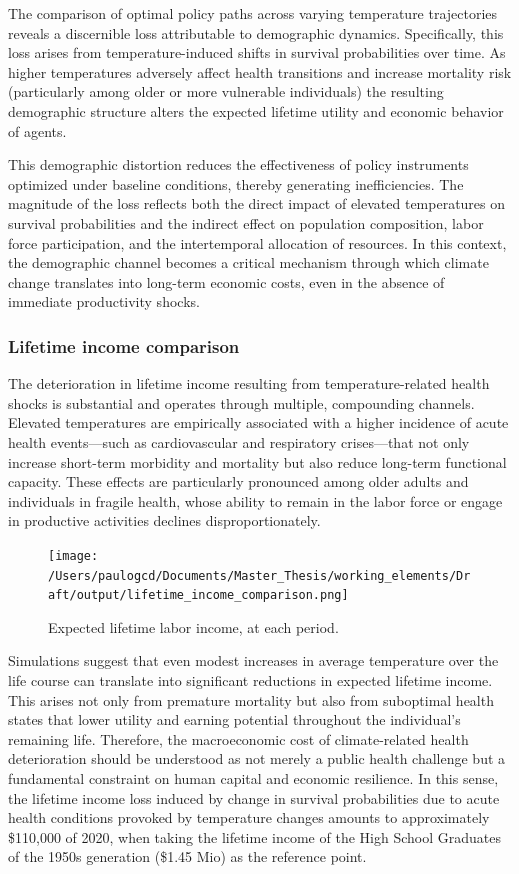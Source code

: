 \documentclass{article}
\begin{document}
The comparison of optimal policy paths across varying temperature trajectories reveals a discernible loss attributable to demographic dynamics.
Specifically, this loss arises from temperature-induced shifts in survival probabilities over time.
As higher temperatures adversely affect health transitions and increase mortality risk (particularly among older or more vulnerable individuals) the resulting demographic structure alters the expected lifetime utility and economic behavior of agents.

This demographic distortion reduces the effectiveness of policy instruments optimized under baseline conditions, thereby generating inefficiencies.
The magnitude of the loss reflects both the direct impact of elevated temperatures on survival probabilities and the indirect effect on population composition, labor force participation, and the intertemporal allocation of resources. In this context, the demographic channel becomes a critical mechanism through which climate change translates into long-term economic costs, even in the absence of immediate productivity shocks.

\subsubsection{Lifetime income comparison}

The deterioration in lifetime income resulting from temperature-related health shocks is substantial and operates through multiple, compounding channels. Elevated temperatures are empirically associated with a higher incidence of acute health events—such as cardiovascular and respiratory crises—that not only increase short-term morbidity and mortality but also reduce long-term functional capacity. These effects are particularly pronounced among older adults and individuals in fragile health, whose ability to remain in the labor force or engage in productive activities declines disproportionately.

\begin{figure}[H]
    \texttt{[image: /Users/paulogcd/Documents/Master\_Thesis/working\_elements/Draft/output/lifetime\_income\_comparison.png]}
    \caption{Expected lifetime labor income, at each period.}
\end{figure}

Simulations suggest that even modest increases in average temperature over the life course can translate into significant reductions in expected lifetime income.
This arises not only from premature mortality but also from suboptimal health states that lower utility and earning potential throughout the individual’s remaining life. Therefore, the macroeconomic cost of climate-related health deterioration should be understood as not merely a public health challenge but a fundamental constraint on human capital and economic resilience.
In this sense, the lifetime income loss induced by change in survival probabilities due to acute health conditions provoked by temperature changes amounts to approximately \$110,000 of 2020, when taking the lifetime income of the High School Graduates of the 1950s generation (\$1.45 Mio) as the reference point.
\end{document}
